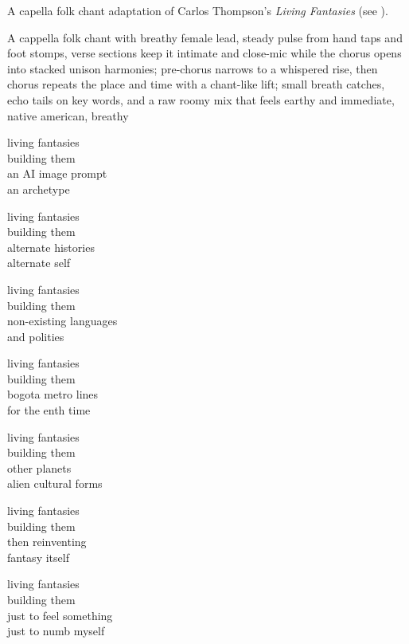 
\begin{notes}
A capella folk chant adaptation of Carlos Thompson's \emph{Living Fantasies} (see \pageref{sec:living-fantasies}).
\end{notes}
\begin{style}
A cappella folk chant with breathy female lead, steady pulse from hand taps and foot stomps, verse sections keep it intimate and close-mic while the chorus opens into stacked unison harmonies; pre-chorus narrows to a whispered rise, then chorus repeats the place and time with a chant-like lift; small breath catches, echo tails on key words, and a raw roomy mix that feels earthy and immediate, native american, breathy
\end{style}
\begin{lyrics}
living fantasies\\
building them\\
an AI image prompt\\
an archetype

living fantasies\\
building them\\
alternate histories\\
alternate self

living fantasies\\
building them\\
non-existing languages\\
and polities

living fantasies\\
building them\\
bogota metro lines\\
for the enth time

living fantasies\\
building them\\
other planets\\
alien cultural forms

living fantasies\\
building them\\
then reinventing\\
fantasy itself

living fantasies\\
building them\\
just to feel something\\
just to numb myself
\end{lyrics}

